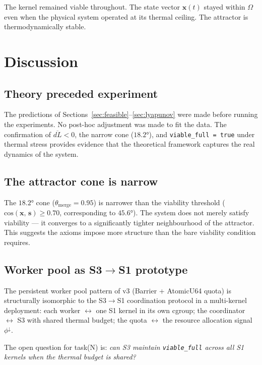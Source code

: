 \documentclass[11pt, a4paper]{article}
\newcommand{\stasis}{\bm{s}}
\newcommand{\sv}{\bm{x}}
\newcommand{\cosim}[2]{\mathrm{cos}\!\left(#1,\, #2\right)}
\begin{document}
The kernel remained viable throughout.
The state vector $\sv(t)$ stayed within $\Omega$ even when the physical
system operated at its thermal ceiling.
The attractor is thermodynamically stable.


\section{Discussion}
\label{sec:discussion}

\subsection{Theory preceded experiment}

The predictions of Sections~\ref{sec:feasible}--\ref{sec:lyapunov} were
made before running the experiments.
No post-hoc adjustment was made to fit the data.
The confirmation of $\overline{dL} < 0$, the narrow cone ($18.2°$),
and \texttt{viable\_full = true} under thermal stress provides evidence
that the theoretical framework captures the real dynamics of the system.

\subsection{The attractor cone is narrow}

The $18.2°$ cone ($\theta_\text{merge} = 0.95$) is narrower than the
viability threshold ($\cosim{\sv}{\stasis} \ge 0.70$, corresponding
to $45.6°$).
The system does not merely satisfy viability — it converges to a
significantly tighter neighbourhood of the attractor.
This suggests the axioms impose more structure than the bare viability
condition requires.

\subsection{Worker pool as S3$\to$S1 prototype}

The persistent worker pool pattern of v3 (Barrier + AtomicU64 quota)
is structurally isomorphic to the S3$\to$S1 coordination protocol
in a multi-kernel deployment:
each worker $\leftrightarrow$ one S1 kernel in its own cgroup;
the coordinator $\leftrightarrow$ S3 with shared thermal budget;
the quota $\leftrightarrow$ the resource allocation signal $\phi^\downarrow$.

The open question for task(N) is:
\emph{can S3 maintain \texttt{viable\_full} across all S1 kernels
when the thermal budget is shared?}
\end{document}
